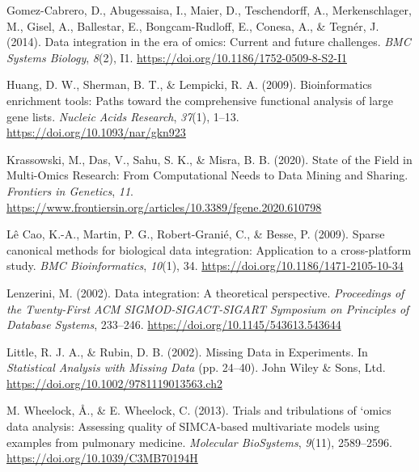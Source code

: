 \documentclass[a4paper, nobind]{templates/ociamthesis}
\newlength{\cslhangindent}
\newenvironment{CSLReferences}[2] %
 {%
  \setlength{\parindent}{0pt}
  \ifodd #1
  \let\oldpar\par
  \def\par{\hangindent=\cslhangindent\oldpar}
  \fi
  \setlength{\parskip}{1mm}
  \setlength{\baselineskip}{6mm}
 }%
 {}
\begin{document}
\begin{CSLReferences}{1}{0}
\leavevmode{}%
Gomez-Cabrero, D., Abugessaisa, I., Maier, D., Teschendorff, A., Merkenschlager, M., Gisel, A., Ballestar, E., Bongcam-Rudloff, E., Conesa, A., \& Tegnér, J. (2014). Data integration in the era of omics: Current and future challenges. \emph{BMC Systems Biology}, \emph{8}(2), I1. \url{https://doi.org/10.1186/1752-0509-8-S2-I1}

\leavevmode{}%
Huang, D. W., Sherman, B. T., \& Lempicki, R. A. (2009). Bioinformatics enrichment tools: Paths toward the comprehensive functional analysis of large gene lists. \emph{Nucleic Acids Research}, \emph{37}(1), 1--13. \url{https://doi.org/10.1093/nar/gkn923}

\leavevmode{}%
Krassowski, M., Das, V., Sahu, S. K., \& Misra, B. B. (2020). State of the {Field} in {Multi}-{Omics} {Research}: {From} {Computational} {Needs} to {Data} {Mining} and {Sharing}. \emph{Frontiers in Genetics}, \emph{11}. \url{https://www.frontiersin.org/articles/10.3389/fgene.2020.610798}

\leavevmode{}%
Lê Cao, K.-A., Martin, P. G., Robert-Granié, C., \& Besse, P. (2009). Sparse canonical methods for biological data integration: Application to a cross-platform study. \emph{BMC Bioinformatics}, \emph{10}(1), 34. \url{https://doi.org/10.1186/1471-2105-10-34}

\leavevmode{}%
Lenzerini, M. (2002). Data integration: A theoretical perspective. \emph{Proceedings of the Twenty-First {ACM} {SIGMOD}-{SIGACT}-{SIGART} Symposium on {Principles} of Database Systems}, 233--246. \url{https://doi.org/10.1145/543613.543644}

\leavevmode{}%
Little, R. J. A., \& Rubin, D. B. (2002). Missing {Data} in {Experiments}. In \emph{Statistical {Analysis} with {Missing} {Data}} (pp. 24--40). John Wiley \& Sons, Ltd. \url{https://doi.org/10.1002/9781119013563.ch2}

\leavevmode{}%
M. Wheelock, Å., \& E. Wheelock, C. (2013). Trials and tribulations of `omics data analysis: Assessing quality of {SIMCA}-based multivariate models using examples from pulmonary medicine. \emph{Molecular BioSystems}, \emph{9}(11), 2589--2596. \url{https://doi.org/10.1039/C3MB70194H}


\end{CSLReferences}
\end{document}
